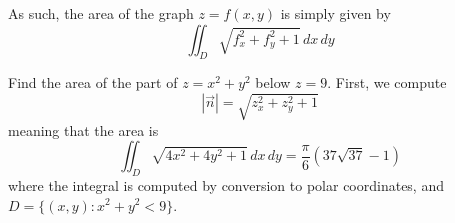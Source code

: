 \documentclass[../main.tex]{subfiles}
\begin{document}
        As such, the area of the graph \(z=f(x,y)\) is simply given by
        \[
        \iint_D\sqrt{f_x^2+f_y^2+1}\,dx\,dy
        \]

        \begin{example}{}{}
            Find the area of the part of \(z=x^2+y^2\) below \(z=9\).
            \tcblower
            First, we compute
            \[
            |\vec{n}|=\sqrt{z_x^2+z_y^2+1}
            \]
            meaning that the area is
            \[
            \iint_D\sqrt{4x^2+4y^2+1}\,dx\,dy=\frac{\pi}{6}(37\sqrt{37}-1)
            \]
            where the integral is computed by conversion to polar coordinates, and \(D=\{(x,y):x^2+y^2<9\}\).
        \end{example}
\end{document}
